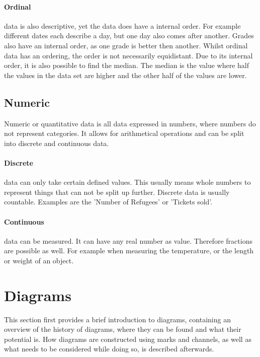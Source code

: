 \paragraph{Ordinal}
data is also descriptive, yet the data does have a internal order. For example different dates each describe a day, but one day also comes after another. Grades also have an internal order, as one grade is better then another. Whilst ordinal data has an ordering, the order is not necessarily equidistant. Due to its internal order, it is also possible to find the median. The median is the value where half the values in the data set are higher and the other half of the values are lower.

\subsection{Numeric}

Numeric or quantitative data is all data expressed in numbers, where numbers do not represent categories. It allows for arithmetical operations and can be split into discrete and continuous data.

\paragraph{Discrete}
data can only take certain defined values. This usually means whole numbers to represent things that can not be split up further.  Discrete data is usually countable. Examples are the 'Number of Refugees' or 'Tickets sold'.

\paragraph{Continuous}
data can be measured. It can have any real number as value. Therefore fractions are possible as well. For example when measuring the temperature, or the length or weight of an object.


\section{Diagrams}\label{sec:diagrams}
This section first provides a brief introduction to diagrams, containing an overview of the history of diagrams, where they can be found and what their potential is. How diagrams are constructed using marks and channels, as well as what needs to be considered while doing so, is described afterwards.

